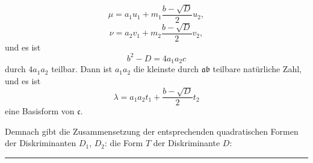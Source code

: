 \[
\mu = a_1 u_1 + m_1 \frac{b - \sqrt{D}}{2} u_2,
\]
\[
\nu = a_2 v_1 + m_2 \frac{b - \sqrt{D}}{2} v_2,
\]
und es ist
\[
b^2 - D = 4a_1 a_2 c
\]
durch $4a_1 a_2$ teilbar. Dann ist $a_1 a_2$ die kleinste durch $\mathfrak{a}\mathfrak{b}$ teilbare natürliche Zahl, und es ist
\[
\lambda = a_1 a_2 t_1 + \frac{b - \sqrt{D}}{2} t_2
\]
eine Basisform von $\mathfrak{c}$.

Demnach gibt die Zusammensetzung der entsprechenden quadratischen Formen der Diskriminanten $D_1$, $D_2$:
die Form $T$ der Diskriminante $D$:

\begin{center}\rule{0.32\linewidth}{0.4pt}\end{center}
